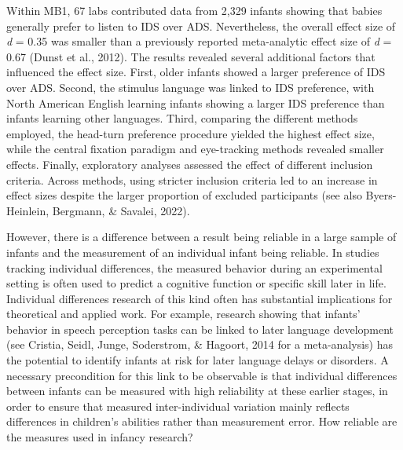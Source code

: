 \documentclass[
  man,floatsintext]{apa6}
\begin{document}
Within MB1, 67 labs contributed data from 2,329 infants showing that babies generally prefer to listen to IDS over ADS.
Nevertheless, the overall effect size of \emph{d} = 0.35 was smaller than a previously reported meta-analytic effect size of \emph{d} = 0.67 (Dunst et al., 2012).
The results revealed several additional factors that influenced the effect size.
First, older infants showed a larger preference of IDS over ADS.
Second, the stimulus language was linked to IDS preference, with North American English learning infants showing a larger IDS preference than infants learning other languages.
Third, comparing the different methods employed, the head-turn preference procedure yielded the highest effect size, while the central fixation paradigm and eye-tracking methods revealed smaller effects.
Finally, exploratory analyses assessed the effect of different inclusion criteria.
Across methods, using stricter inclusion criteria led to an increase in effect sizes despite the larger proportion of excluded participants (see also Byers-Heinlein, Bergmann, \& Savalei, 2022).

However, there is a difference between a result being reliable in a large sample of infants and the measurement of an individual infant being reliable.
In studies tracking individual differences, the measured behavior during an experimental setting is often used to predict a cognitive function or specific skill later in life.
Individual differences research of this kind often has substantial implications for theoretical and applied work.
For example, research showing that infants' behavior in speech perception tasks can be linked to later language development (see Cristia, Seidl, Junge, Soderstrom, \& Hagoort, 2014 for a meta-analysis) has the potential to identify infants at risk for later language delays or disorders.
A necessary precondition for this link to be observable is that individual differences between infants can be measured with high reliability at these earlier stages, in order to ensure that measured inter-individual variation mainly reflects differences in children's abilities rather than measurement error.
How reliable are the measures used in infancy research?
\end{document}
